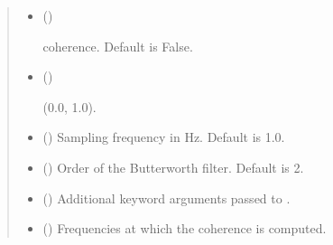 \documentclass[letterpaper,10pt,english]{sphinxmanual}
\begin{document}
\begin{fulllineitems}
\begin{quote}
\begin{description}
\begin{itemize}
\item {} 
\sphinxAtStartPar
{} (\sphinxstyleliteralemphasis{\sphinxupquote{, }}) \textendash{} \begin{description}
\sphinxAtStartPar
coherence. Default is False.

\end{description}


\item {} 
\sphinxAtStartPar
{} (\sphinxstyleliteralemphasis{\sphinxupquote{, }}) \textendash{} \begin{description}
\sphinxAtStartPar
(0.0, 1.0).

\end{description}


\item {} 
\sphinxAtStartPar
{} (\sphinxstyleliteralemphasis{\sphinxupquote{, }}) \textendash{} Sampling frequency in Hz. Default is 1.0.

\item {} 
\sphinxAtStartPar
{} (\sphinxstyleliteralemphasis{\sphinxupquote{, }}) \textendash{} Order of the Butterworth filter. Default is 2.

\item {} 
\sphinxAtStartPar
{} (\sphinxstyleliteralemphasis{\sphinxupquote{, }}) \textendash{} Additional keyword arguments passed to .

\end{itemize}

\sphinxAtStartPar
\begin{itemize}
\item {} 
\sphinxAtStartPar
{} () \textendash{} Frequencies at which the coherence is computed.


\end{itemize}
\end{description}
\end{quote}
\end{fulllineitems}
\end{document}
